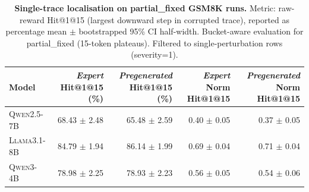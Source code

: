 \begin{table}[t]
\centering
\small
\renewcommand{\arraystretch}{1.08}
\begin{tabular}{l r r r r}
\toprule
\textbf{Model} & \textbf{\textit{Expert} Hit@1@15 (\%)} & \textbf{\textit{Pregenerated} Hit@1@15 (\%)} & \textbf{\textit{Expert} Norm Hit@1@15} & \textbf{\textit{Pregenerated} Norm Hit@1@15} \\
\midrule
\textsc{Qwen2.5-7B} & 68.43 $\pm$ 2.48 & 65.48 $\pm$ 2.59 & 0.40 $\pm$ 0.05 & 0.37 $\pm$ 0.05 \\
\textsc{Llama3.1-8B} & 84.79 $\pm$ 1.94 & 86.14 $\pm$ 1.99 & 0.69 $\pm$ 0.04 & 0.71 $\pm$ 0.04 \\
\textsc{Qwen3-4B} & 78.98 $\pm$ 2.25 & 78.93 $\pm$ 2.23 & 0.56 $\pm$ 0.05 & 0.54 $\pm$ 0.06 \\
\bottomrule
\end{tabular}
\caption{\textbf{Single-trace localisation on partial_fixed GSM8K runs.} Metric: raw-reward Hit@1@15 (largest downward step in corrupted trace), reported as percentage mean $\pm$ bootstrapped 95\% CI half-width. Bucket-aware evaluation for partial_fixed (15-token plateaus). Filtered to single-perturbation rows (severity=1).}
\label{tab:localisation_hit1at15_partial_fixed_raw}
\end{table}